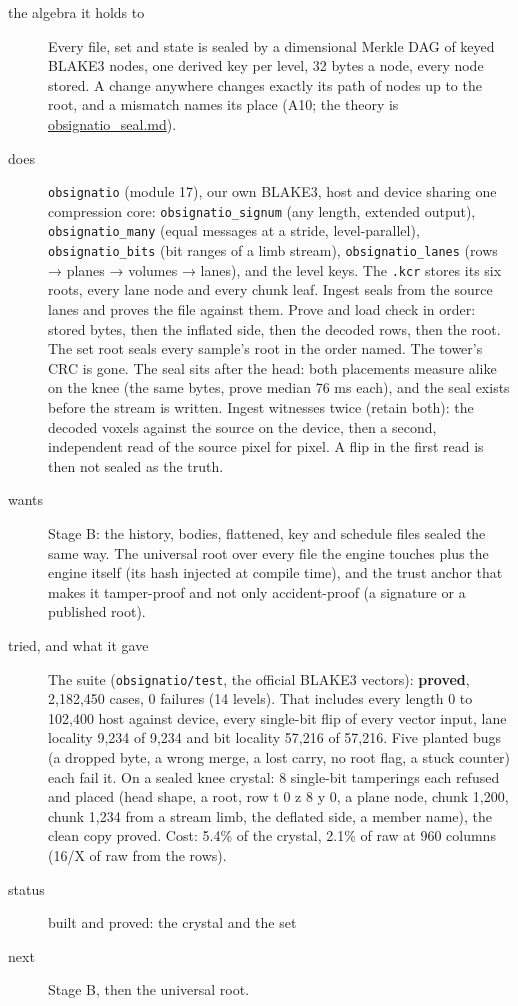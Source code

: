 \begin{description}
\item[{the algebra it holds to}] Every file, set and state is sealed by a dimensional Merkle DAG of keyed BLAKE3 nodes, one derived key per level, 32 bytes a node, every node stored. A change anywhere changes exactly its path of nodes up to the root, and a mismatch names its place (A10; the theory is \hyperref[chap:obsignatio-seal]{obsignatio\_\allowbreak{}seal.md}).
\item[{does}] \texttt{obsignatio} (module 17), our own BLAKE3, host and device sharing one compression core: \texttt{obsignatio\_\allowbreak{}signum} (any length, extended output), \texttt{obsignatio\_\allowbreak{}many} (equal messages at a stride, level-parallel), \texttt{obsignatio\_\allowbreak{}bits} (bit ranges of a limb stream), \texttt{obsignatio\_\allowbreak{}lanes} (rows → planes → volumes → lanes), and the level keys. The \texttt{.\allowbreak{}kcr} stores its six roots, every lane node and every chunk leaf. Ingest seals from the source lanes and proves the file against them. Prove and load check in order: stored bytes, then the inflated side, then the decoded rows, then the root. The set root seals every sample's root in the order named. The tower's CRC is gone. The seal sits after the head: both placements measure alike on the knee (the same bytes, prove median 76 ms each), and the seal exists before the stream is written. Ingest witnesses twice (retain both): the decoded voxels against the source on the device, then a second, independent read of the source pixel for pixel. A flip in the first read is then not sealed as the truth.
\item[{wants}] Stage B: the history, bodies, flattened, key and schedule files sealed the same way. The universal root over every file the engine touches plus the engine itself (its hash injected at compile time), and the trust anchor that makes it tamper-proof and not only accident-proof (a signature or a published root).
\item[{tried, and what it gave}] The suite (\texttt{obsignatio/\allowbreak{}test}, the official BLAKE3 vectors): \textbf{proved}, 2,182,450 cases, 0 failures (14 levels). That includes every length 0 to 102,400 host against device, every single-bit flip of every vector input, lane locality 9,234 of 9,234 and bit locality 57,216 of 57,216. Five planted bugs (a dropped byte, a wrong merge, a lost carry, no root flag, a stuck counter) each fail it. On a sealed knee crystal: 8 single-bit tamperings each refused and placed (head shape, a root, row t 0 z 8 y 0, a plane node, chunk 1,200, chunk 1,234 from a stream limb, the deflated side, a member name), the clean copy proved. Cost: 5.4\% of the crystal, 2.1\% of raw at 960 columns (16/X of raw from the rows).
\item[{status}] built and proved: the crystal and the set
\item[{next}] Stage B, then the universal root.
\end{description}

